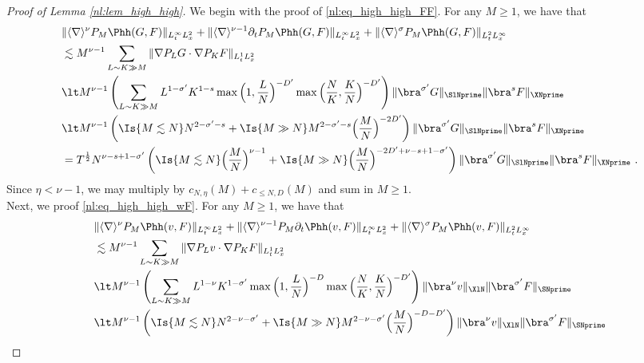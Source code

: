 \documentclass[11pt]{article}
\begin{document}
\begin{proof}[Proof of Lemma \ref{nl:lem_high_high}]
We begin with the proof of \eqref{nl:eq_high_high_FF}. For any \( M \geq 1 \), we have that 
\begin{align*}
&\| \langle \nabla \rangle^{\nu} P_M \Phh(G,F) \|_{L_t^\infty L_x^2}+\| \langle \nabla \rangle^{\nu-1} \partial_t P_M \Phh(G,F) \|_{L_t^\infty L_x^2}  + \| \langle \nabla \rangle^{\sigma} P_M \Phh(G,F) \|_{L_t^2 L_x^\infty}\\
&\lesssim M^{\nu-1} \sum_{L\sim K \gg M} \| \nabla P_L G\cdot \nabla P_K F \|_{L_t^1L_x^2}\\
&\lt M^{\nu-1} \left( \sum_{L\sim K\gg M} L^{1-\sigma^\prime} K^{1-s} \max \Big( 1,\frac{L}{N} \Big)^{-D^\prime} \max\Big( \frac{N}{K}, \frac{K}{N} \Big)^{-D^\prime} \right) \| \bra^{\sigma^\prime} G \|_{\SlNprime} 
\| \bra^s F \|_{\XNprime}\\
&\lt M^{\nu-1} \left(\Is{M\lesssim N} N^{2-\sigma^\prime-s} + \Is{M\gg N} M^{2-\sigma^\prime-s} \Big( \frac{M}{N} \Big)^{-2D^\prime} \right)\| \bra^{\sigma^\prime} G \|_{\SlNprime} 
\| \bra^s F \|_{\XNprime} \\
&= T^{\frac{1}{2}} N^{\nu-s+1-\sigma^\prime} \left( \Is{M\lesssim N} \Big( \frac{M}{N} \Big)^{\nu-1} + \Is{M\gg N} \Big( \frac{M}{N} \Big)^{-2D^\prime+\nu-s+1-\sigma^\prime} \right) \| \bra^{\sigma^\prime} G \|_{\SlNprime} 
\| \bra^s F \|_{\XNprime}~. 
\end{align*}
Since \( \eta < \nu-1 \), we may multiply by \( c_{N,\eta}(M) + c_{\leq N,D}(M) \) and sum in \( M \geq 1\). \\
Next, we proof \eqref{nl:eq_high_high_wF}. For any \( M \geq 1 \), we have that 
\begin{align*}
&\| \langle \nabla \rangle^{\nu} P_M \Phh(v,F) \|_{L_t^\infty L_x^2}+ \| \langle \nabla \rangle^{\nu-1} P_M \partial_t \Phh(v,F) \|_{L_t^\infty L_x^2}  + \| \langle \nabla \rangle^{\sigma} P_M \Phh(v,F) \|_{L_t^2 L_x^\infty}\\
&\lesssim M^{\nu-1} \sum_{L\sim K \gg M} \| \nabla P_L v\cdot \nabla P_K F \|_{L_t^1L_x^2}\\
&\lt M^{\nu-1} \left( \sum_{L\sim K\gg M} L^{1-\nu} K^{1-\sigma^\prime} \max \Big( 1,\frac{L}{N} \Big)^{-D} \max\Big( \frac{N}{K}, \frac{K}{N} \Big)^{-D^\prime} \right) \| \bra^{\nu} v \|_{\XlN} 
\| \bra^{\sigma^\prime} F \|_{\SNprime}\\
&\lt M^{\nu-1} \left( \Is{M\lesssim N} N^{2-\nu-\sigma^\prime} + \Is{M\gg N} M^{2-\nu-\sigma^\prime} \Big( \frac{M}{N} \Big)^{-D-D^\prime} \right) \| \bra^{\nu} v \|_{\XlN}  \| \bra^{\sigma^\prime} F \|_{\SNprime} \\

\end{align*}
\end{proof}
\end{document}
